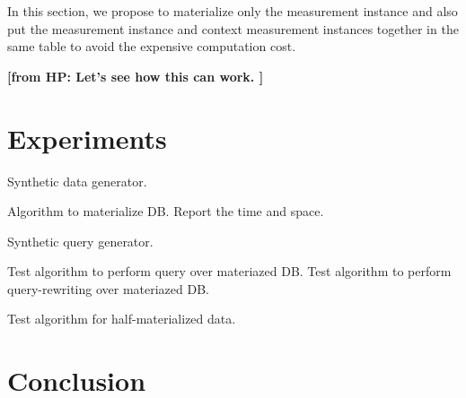 \documentclass[conference]{IEEEtran}
\newcommand{\from}[2]{{\bf[{\sc from #1:} #2]}}
\begin{document}
In this section, we propose to materialize only the measurement
instance and also put the measurement instance and context measurement
instances together in the same table to avoid the expensive
computation cost. 

\from{HP}{Let's see how this can work. }

\section{Experiments}

Synthetic data generator. 

Algorithm to materialize DB. 
Report the time and space. 

Synthetic query generator. 

Test algorithm to perform query over materiazed DB.
Test algorithm to perform query-rewriting over materiazed DB.

Test algorithm for half-materialized data.



\section{Conclusion}




\end{document}
